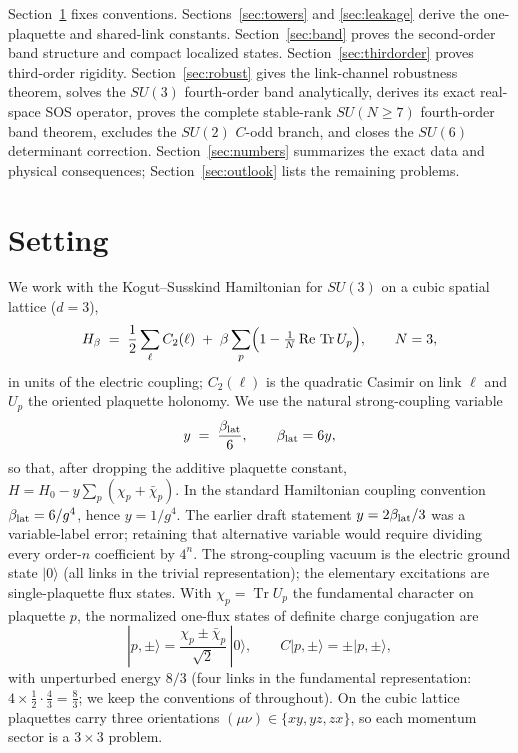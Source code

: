 \documentclass[11pt]{article}
\newcommand{\Tr}{\operatorname{Tr}}
\newcommand{\ket}[1]{|#1\rangle}
\begin{document}
Section~\ref{sec:setting} fixes conventions. Sections~\ref{sec:towers} and
\ref{sec:leakage} derive the one-plaquette and shared-link constants.
Section~\ref{sec:band} proves the second-order band structure and compact
localized states. Section~\ref{sec:thirdorder} proves third-order rigidity.
Section~\ref{sec:robust} gives the link-channel robustness theorem, solves the
$SU(3)$ fourth-order band analytically, derives its exact real-space SOS
operator, proves the complete stable-rank
$SU(N\geq7)$ fourth-order band theorem, excludes the $SU(2)$ $C$-odd branch,
and closes the $SU(6)$ determinant correction. Section~\ref{sec:numbers}
summarizes the exact data and physical consequences; Section~\ref{sec:outlook}
lists the remaining problems.

\section{Setting}
\label{sec:setting}

We work with the Kogut--Susskind Hamiltonian \cite{KogutSusskind1975} for
$SU(3)$ on a cubic spatial lattice ($d=3$),
\begin{equation}
H_\beta \;=\; \frac12\sum_{\ell} C_2(\ell)\;+\;\beta\sum_{p}
\Bigl(1-\tfrac1N\,\mathrm{Re}\,\Tr U_p\Bigr),\qquad N=3,
\label{eq:H}
\end{equation}
in units of the electric coupling; $C_2(\ell)$ is the quadratic Casimir on
link $\ell$ and $U_p$ the oriented plaquette holonomy. We use the natural
strong-coupling variable
\begin{equation}
y \;=\; \frac{\beta_{\rm lat}}{6},
\qquad
\beta_{\rm lat}=6y,
\label{eq:correct-y-normalization}
\end{equation}
so that, after dropping the additive plaquette constant,
$H=H_0-y\sum_p(\chi_p+\bar\chi_p)$.  In the standard Hamiltonian
coupling convention $\beta_{\rm lat}=6/g^4$, hence $y=1/g^4$.
The earlier draft statement $y=2\beta_{\rm lat}/3$ was a variable-label
error; retaining that alternative variable would require dividing every
order-$n$ coefficient by $4^n$. The strong-coupling vacuum is the
electric ground state $\ket{0}$ (all links in the trivial representation);
the elementary excitations are single-plaquette flux states. With
$\chi_p=\Tr U_p$ the fundamental character on plaquette $p$, the normalized
one-flux states of definite charge conjugation are
\begin{equation}
\ket{p,\pm}=\frac{\chi_p\pm\bar\chi_p}{\sqrt2}\,\ket{0},
\qquad C\ket{p,\pm}=\pm\ket{p,\pm},
\end{equation}
with unperturbed energy $8/3$ (four links in the fundamental representation:
$4\times\tfrac12\cdot\tfrac43=\tfrac83$; we keep the conventions of
\cite{companion} throughout). On the cubic lattice plaquettes carry three
orientations $(\mu\nu)\in\{xy,yz,zx\}$, so each momentum sector is a
$3\times3$ problem.
\end{document}
